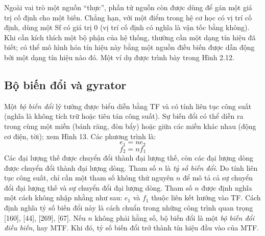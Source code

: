 Ngoài vai trò một nguồn ``thực'', phần tử nguồn còn được dùng để gán một giá trị cố định cho một biến. Chẳng hạn, với một điểm trong hệ cơ học có vị trí cố định, dùng một Sf có giá trị 0 (vị trí cố định có nghĩa là vận tốc bằng không). Khi cần kích thích một bộ phận của hệ thống, thường cần một dạng tín hiệu đã biết; có thể mô hình hóa tín hiệu này bằng một nguồn điều biến được dẫn động bởi một dạng tín hiệu nào đó. Một ví dụ được trình bày trong Hình 2.12.
\subsection{Bộ biến đổi và gyrator}
Một \emph{bộ biến đổi} lý tưởng được biểu diễn bằng TF và có tính liên tục công suất (nghĩa là không tích trữ hoặc tiêu tán công suất). Sự biến đổi có thể diễn ra trong cùng một miền (bánh răng, đòn bẩy) hoặc giữa các miền khác nhau (động cơ điện, tời); xem Hình 13. Các phương trình là:
\begin{equation}e_1=ne_2\tag{2.3}\end{equation}
\begin{equation}f_2=nf_1\tag{2.4}\end{equation}
Các đại lượng thế được chuyển đổi thành đại lượng thế, còn các đại lượng dòng được chuyển đổi thành đại lượng dòng. Tham số $n$ là \emph{tỷ số biến đổi}. Do tính liên tục công suất, chỉ cần một tham số không thứ nguyên $n$ để mô tả cả sự chuyển đổi đại lượng thế và sự chuyển đổi đại lượng dòng. Tham số $n$ được định nghĩa một cách không nhập nhằng như sau: $e_1$ và $f_1$ thuộc liên kết hướng vào TF. Cách định nghĩa tỷ số biến đổi này là cách chuẩn trong những công trình quan trọng [160], [44], [269], [67]. Nếu $n$ không phải hằng số, bộ biến đổi là một \emph{bộ biến đổi điều biến}, hay MTF. Khi đó, tỷ số biến đổi trở thành tín hiệu đầu vào của MTF.

